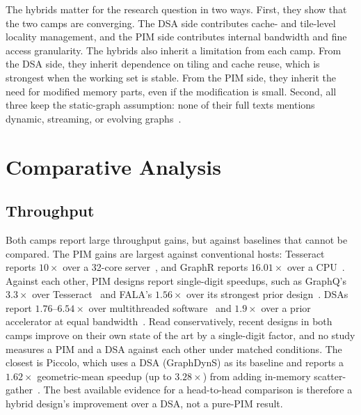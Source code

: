 \documentclass[journal,onecolumn]{IEEEtran}
\begin{document}
The hybrids matter for the research question in two ways. First, they show that the two camps are converging. The DSA side contributes cache- and tile-level locality management, and the PIM side contributes internal bandwidth and fine access granularity. The hybrids also inherit a limitation from each camp. From the DSA side, they inherit dependence on tiling and cache reuse, which is strongest when the working set is stable. From the PIM side, they inherit the need for modified memory parts, even if the modification is small. Second, all three keep the static-graph assumption: none of their full texts mentions dynamic, streaming, or evolving graphs~\cite{shin2025piccolo,shin2025fala,yenimol2026cograf}.

\section{Comparative Analysis}\label{sec:analysis}
\subsection{Throughput}
Both camps report large throughput gains, but against baselines that cannot be compared. The PIM gains are largest against conventional hosts: Tesseract reports $10\times$ over a 32-core server~\cite{ahn2015tesseract}, and GraphR reports $16.01\times$ over a CPU~\cite{song2018graphr}. Against each other, PIM designs report single-digit speedups, such as GraphQ's $3.3\times$ over Tesseract~\cite{zhuo2019graphq} and FALA's $1.56\times$ over its strongest prior design~\cite{shin2025fala}. DSAs report $1.76$--$6.54\times$ over multithreaded software~\cite{ham2016graphicionado} and $1.9\times$ over a prior accelerator at equal bandwidth~\cite{yan2019graphdyns}. Read conservatively, recent designs in both camps improve on their own state of the art by a single-digit factor, and no study measures a PIM and a DSA against each other under matched conditions. The closest is Piccolo, which uses a DSA (GraphDynS) as its baseline and reports a $1.62\times$ geometric-mean speedup (up to $3.28\times$) from adding in-memory scatter-gather~\cite{shin2025piccolo}. The best available evidence for a head-to-head comparison is therefore a hybrid design's improvement over a DSA, not a pure-PIM result.
\end{document}

